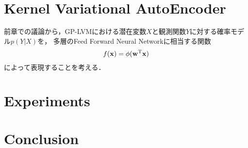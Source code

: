 \documentclass[11pt,a4j]{jarticle}
\begin{document}
  \section{Kernel Variational AutoEncoder}
    前章での議論から，GP-LVMにおける潜在変数$X$と観測関数$Y$に対する確率モデル$p(Y|X)$を，
    多層のFeed Forward Neural Networkに相当する関数
    \begin{align}
      f({\bf x}) = \phi( {\bf w}^{\mathrm{T}} {\bf x})
    \end{align}
    によって表現することを考える．


  \section{Experiments}
  \section{Conclusion}

\end{document}
